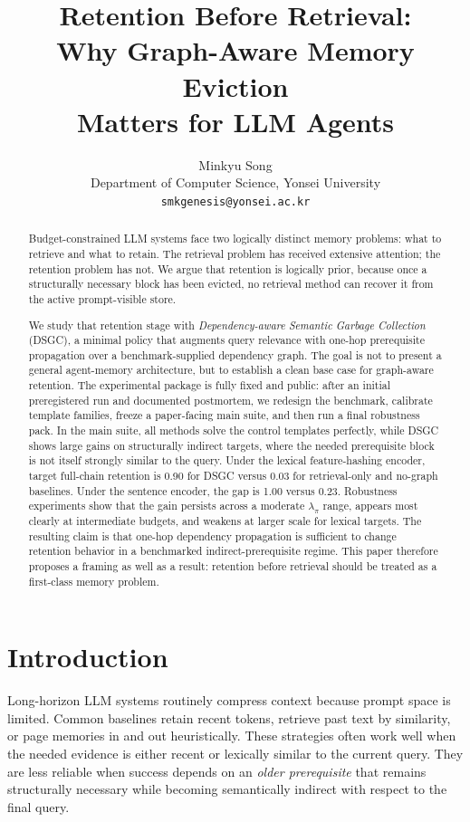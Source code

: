 \documentclass[10pt]{article}
\title{\textbf{Retention Before Retrieval:\\Why Graph-Aware Memory Eviction\\Matters for LLM Agents}}
\author{Minkyu Song \\ \small Department of Computer Science, Yonsei University \\ \small \texttt{smkgenesis@yonsei.ac.kr}}
\date{}
\begin{document}
\maketitle

\begin{abstract}
Budget-constrained LLM systems face two logically distinct memory problems: what to retrieve and what to retain. The retrieval problem has received extensive attention; the retention problem has not. We argue that retention is logically prior, because once a structurally necessary block has been evicted, no retrieval method can recover it from the active prompt-visible store.

We study that retention stage with \emph{Dependency-aware Semantic Garbage Collection} (DSGC), a minimal policy that augments query relevance with one-hop prerequisite propagation over a benchmark-supplied dependency graph. The goal is not to present a general agent-memory architecture, but to establish a clean base case for graph-aware retention. The experimental package is fully fixed and public: after an initial preregistered run and documented postmortem, we redesign the benchmark, calibrate template families, freeze a paper-facing main suite, and then run a final robustness pack. In the main suite, all methods solve the control templates perfectly, while DSGC shows large gains on structurally indirect targets, where the needed prerequisite block is not itself strongly similar to the query. Under the lexical feature-hashing encoder, target full-chain retention is 0.90 for DSGC versus 0.03 for retrieval-only and no-graph baselines. Under the sentence encoder, the gap is 1.00 versus 0.23. Robustness experiments show that the gain persists across a moderate $\lambda_\pi$ range, appears most clearly at intermediate budgets, and weakens at larger scale for lexical targets. The resulting claim is that one-hop dependency propagation is sufficient to change retention behavior in a benchmarked indirect-prerequisite regime. This paper therefore proposes a framing as well as a result: retention before retrieval should be treated as a first-class memory problem.
\end{abstract}

\section{Introduction}

Long-horizon LLM systems routinely compress context because prompt space is limited. Common baselines retain recent tokens, retrieve past text by similarity, or page memories in and out heuristically. These strategies often work well when the needed evidence is either recent or lexically similar to the current query. They are less reliable when success depends on an \emph{older prerequisite} that remains structurally necessary while becoming semantically indirect with respect to the final query.
\end{document}
